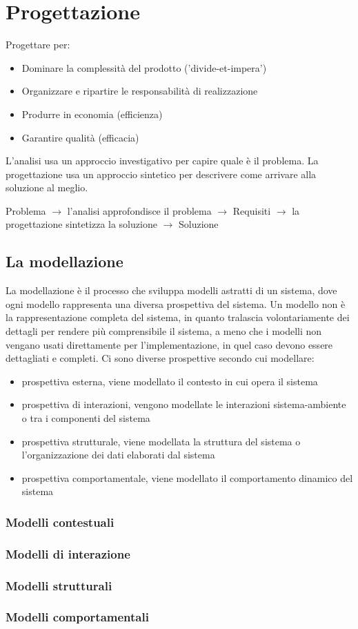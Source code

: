 \chapter{Progettazione}

Progettare per:
\begin{itemize}
\item Dominare la complessità del prodotto ('divide-et-impera')
\item Organizzare e ripartire le responsabilità di realizzazione
\item Produrre in economia (efficienza)
\item Garantire qualità (efficacia)
\end{itemize}


L'analisi usa un approccio investigativo per capire quale è il problema.
La progettazione usa un approccio sintetico per descrivere come arrivare alla soluzione al meglio.

Problema $\to$ l'analisi approfondisce il problema $\to$ Requisiti $\to$ la progettazione sintetizza la soluzione $\to$ Soluzione

\section{La modellazione}

La modellazione è il processo che sviluppa modelli astratti di un sistema, dove ogni modello rappresenta una diversa prospettiva del sistema.
Un modello non è la rappresentazione completa del sistema, in quanto tralascia volontariamente dei dettagli per rendere più comprensibile il sistema, a meno che i modelli non vengano usati direttamente per l'implementazione, in quel caso devono essere dettagliati e completi.
Ci sono diverse prospettive secondo cui modellare:
\begin{itemize}
\item prospettiva esterna, viene modellato il contesto in cui opera il sistema
\item prospettiva di interazioni, vengono modellate le interazioni sistema-ambiente o tra i componenti del sistema
\item prospettiva strutturale, viene modellata la struttura del sistema o l'organizzazione dei dati elaborati dal sistema
\item prospettiva comportamentale, viene modellato il comportamento dinamico del sistema
\end{itemize}

\subsection{Modelli contestuali}


\subsection{Modelli di interazione}


\subsection{Modelli strutturali}


\subsection{Modelli comportamentali}

